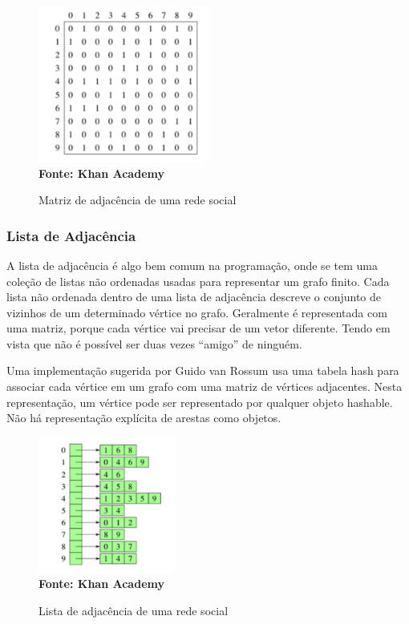 \begin{figure}[ht]
	\centering	
	\caption[\hspace{0.1cm}Matriz de adjacência de uma rede social.]{Matriz de adjacência de uma rede social}
	\vspace{-0.4cm}
	\includegraphics[width=0.5\textwidth]{figuras/matriz-adjacencia.png}
	 \vspace{-0.2cm}
	\\\textbf{\footnotesize Fonte: Khan Academy}
	\label{fig:figura1}
\end{figure}

\subsubsection{\esp Lista de Adjacência}

A lista de adjacência é algo bem comum na programação, onde se tem uma coleção de listas não ordenadas usadas para representar um grafo finito. Cada lista não ordenada dentro de uma lista de adjacência descreve o conjunto de vizinhos de um determinado vértice no grafo. Geralmente é representada com uma matriz, porque cada vértice vai precisar de um vetor diferente. Tendo em vista que não é possível ser duas vezes “amigo” de ninguém.

Uma implementação sugerida por Guido van Rossum usa uma tabela hash para associar cada vértice em um grafo com uma matriz de vértices adjacentes. Nesta representação, um vértice pode ser representado por qualquer objeto hashable. Não há representação explícita de arestas como objetos.

\begin{figure}[ht]
	\centering	
	\caption[\hspace{0.1cm}Lista de adjacência de uma rede social.]{Lista de adjacência de uma rede social}
	\vspace{-0.4cm}
	\includegraphics[width=0.4\textwidth]{figuras/lista-adjacencia.png}
	 \vspace{-0.2cm}
	\\\textbf{\footnotesize Fonte: Khan Academy}
	\label{fig:figura1}
\end{figure}

